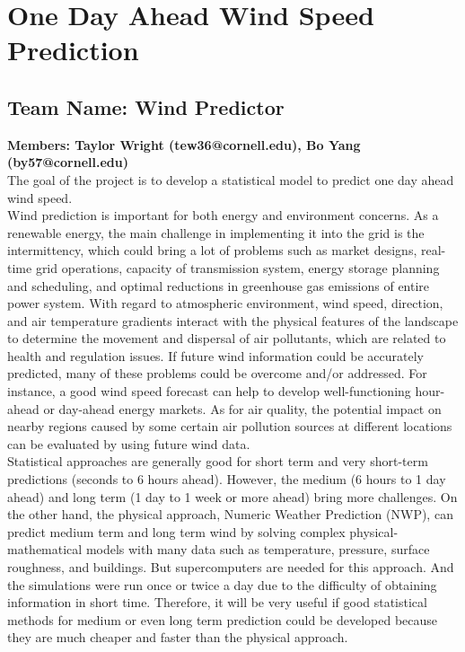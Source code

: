 \documentclass{article}
\begin{document}
\section*{One Day Ahead Wind Speed Prediction}
\subsection*{Team Name: Wind Predictor} 
{\bf Members: Taylor Wright (tew36@cornell.edu), Bo Yang (by57@cornell.edu)}\\

The goal of the project is to develop a statistical model to predict one day ahead wind speed.\\

Wind prediction is important for both energy and environment concerns. As a renewable energy, the main challenge in implementing it into the grid is the intermittency, which could bring a lot of problems such as market designs, real-time grid operations, capacity of transmission system, energy storage planning and scheduling, and optimal reductions in greenhouse gas emissions of entire power system.  With regard to atmospheric environment, wind speed, direction, and air temperature gradients interact with the physical features of the landscape to determine the movement and dispersal of air pollutants, which are related to health and regulation issues.  If future wind information could be accurately predicted, many of these problems could be overcome and/or addressed. For instance, a good wind speed forecast can help to develop well-functioning hour-ahead or day-ahead energy markets. As for air quality, the potential impact on nearby regions caused by some certain air pollution sources at different locations can be evaluated by using future wind data.\\

Statistical approaches are generally good for short term and very short-term predictions (seconds to 6 hours ahead).  However, the medium (6 hours to 1 day ahead) and long term (1 day to 1 week or more ahead) bring more challenges.  On the other hand, the physical approach, Numeric Weather Prediction (NWP), can predict medium term and long term wind by solving complex physical-mathematical models with many data such as temperature, pressure, surface roughness, and buildings.  But supercomputers are needed for this approach.  And the simulations were run once or twice a day due to the difficulty of obtaining information in short time.  Therefore, it will be very useful if good statistical methods for medium or even long term prediction could be developed because they are much cheaper and faster than the physical approach.\\
\end{document}
